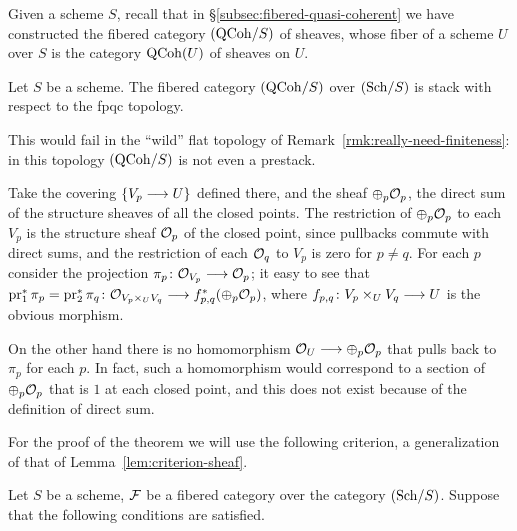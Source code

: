 \begin{4   STACKS}
\begin{4.2 Descent for quasi-coherent sheaves}
Given a scheme $S$, recall that in \S\ref{subsec:fibered-quasi-coherent} we have constructed the fibered category $({\mathrm{QCoh}/S})$ of \qc sheaves, whose fiber of a scheme $U$ over $S$ is the category $\operatorname{QCoh}(U)$ of \qc sheaves on $U$.

\begin{theorem}\label{thm:main}
Let $S$ be a scheme. The fibered category $({\mathrm{QCoh}/S})$ over $({\mathrm{Sch}/S})$ is stack with respect to the fpqc topology.
\end{theorem}


\begin{remark}\label{rmk:really-really-need-finiteness}
This would fail in the ``wild'' flat topology of Remark~\ref{rmk:really-need-finiteness}: in this topology $({\mathrm{QCoh}/S})$ is not even a prestack.

Take the covering $\{V_p \arr U\}$ defined there, and the \qc sheaf $\oplus_p \mathcal{O}_p$, the direct sum of the structure sheaves of all the closed points. The restriction of $\oplus_p \mathcal{O}_p$ to each $V_p$ is the structure sheaf $\mathcal{O}_p$ of the closed point, since pullbacks commute with direct sums, and the restriction of each $\mathcal{O}_q$ to $V_p$ is zero for $p \neq q$. For each $p$ consider the projection $\pi_p \colon \cO_{V_p} \arr \cO_p$; it easy to see that $\pr_1^* \pi_p = \pr_2^* \pi_q \colon \cO_{V_p \times_U V_q} \arr f_{p,q}^* (\oplus_{p} \cO_p)$, where $f_{p,q} \colon V_p \times_U V_q \arr U$ is the obvious morphism.

On the other hand there is no homomorphism $\cO_U \arr \oplus_{p} \cO_p$ that pulls back to $\pi_p$ for each $p$. In fact, such a homomorphism would correspond to a section of $\oplus_{p} \mathcal{O}_p$ that is $1$ at each closed point, and this does not exist because of the definition of direct sum.
\end{remark}

For the proof of the theorem we will use the following criterion, a generalization of that of Lemma~\ref{lem:criterion-sheaf}.


\begin{lemma}\label{lem:criterion-stack}

Let $S$ be a scheme, $\mathcal{F}$ be a fibered category over the category $({\mathrm{Sch}/S})$. Suppose that the following conditions are satisfied.

\begin{enumeratei}


\end{enumeratei}
\end{lemma}
\end{4.2 Descent for quasi-coherent sheaves}
\end{4   STACKS}
